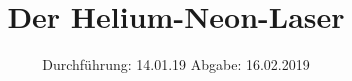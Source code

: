 

\subject{V61}
\title{Der Helium-Neon-Laser}
\date{
  Durchführung: 14.01.19
  \hspace{3em}
  Abgabe: 16.02.2019
}



\maketitle
\thispagestyle{empty}
\tableofcontents
\newpage
\setcounter{page}{1}





\printbibliography


